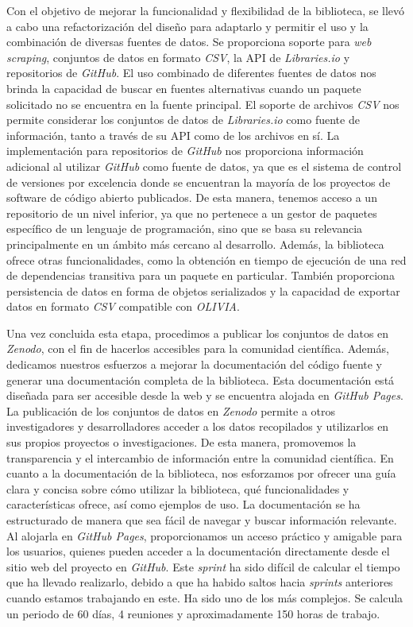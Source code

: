Con el objetivo de mejorar la funcionalidad y flexibilidad de la biblioteca, se llevó a cabo una refactorización del 
diseño para adaptarlo y permitir el uso y la combinación de diversas fuentes de datos. Se proporciona soporte para 
\textit{web scraping}, conjuntos de datos en formato \textit{CSV}, la API de \textit{Libraries.io} y repositorios de 
\textit{GitHub}.
El uso combinado de diferentes fuentes de datos nos brinda la capacidad de buscar en fuentes alternativas cuando un 
paquete solicitado no se encuentra en la fuente principal. El soporte de archivos \textit{CSV} nos permite considerar 
los conjuntos de datos de \textit{Libraries.io} como fuente de información, tanto a través de su API como de los archivos 
en sí. La implementación para repositorios de \textit{GitHub} nos proporciona información adicional al utilizar 
\textit{GitHub} como fuente de datos, ya que es el sistema de control de versiones por excelencia donde se encuentran 
la mayoría de los proyectos de software de código abierto publicados. De esta manera, tenemos acceso a un repositorio 
de un nivel inferior, ya que no pertenece a un gestor de paquetes específico de un lenguaje de programación, sino que 
se basa su relevancia principalmente en un ámbito más cercano al desarrollo.
Además, la biblioteca ofrece otras funcionalidades, como la obtención en tiempo de ejecución de una red de dependencias 
transitiva para un paquete en particular. También proporciona persistencia de datos en forma de objetos serializados y 
la capacidad de exportar datos en formato \textit{CSV} compatible con \textit{OLIVIA}.

Una vez concluida esta etapa, procedimos a publicar los conjuntos de datos en \textit{Zenodo}\cite{daniel_alonso_bascones_2023_8095863}, con el fin de hacerlos 
accesibles para la comunidad científica. Además, dedicamos nuestros esfuerzos a mejorar la documentación del código 
fuente y generar una documentación completa de la biblioteca. Esta documentación está diseñada para ser accesible desde
 la web y se encuentra alojada en \textit{GitHub Pages}\cite{olivia_finder_docpages}.
La publicación de los conjuntos de datos en \textit{Zenodo} permite a otros investigadores y desarrolladores acceder a 
los datos recopilados y utilizarlos en sus propios proyectos o investigaciones. De esta manera, promovemos la transparencia 
y el intercambio de información entre la comunidad científica.
En cuanto a la documentación de la biblioteca, nos esforzamos por ofrecer una guía clara y concisa sobre cómo utilizar 
la biblioteca, qué funcionalidades y características ofrece, así como ejemplos de uso. La documentación se ha estructurado 
de manera que sea fácil de navegar y buscar información relevante. Al alojarla en \textit{GitHub Pages}, proporcionamos 
un acceso práctico y amigable para los usuarios, quienes pueden acceder a la documentación directamente desde el sitio web
 del proyecto en \textit{GitHub}.
Este \textit{sprint} ha sido difícil de calcular el tiempo que ha llevado realizarlo, debido a que ha habido saltos 
hacia \textit{sprints} anteriores cuando estamos trabajando en este. Ha sido uno de los más complejos. Se calcula un 
periodo de 60 días, 4 reuniones y aproximadamente 150 horas de trabajo.

